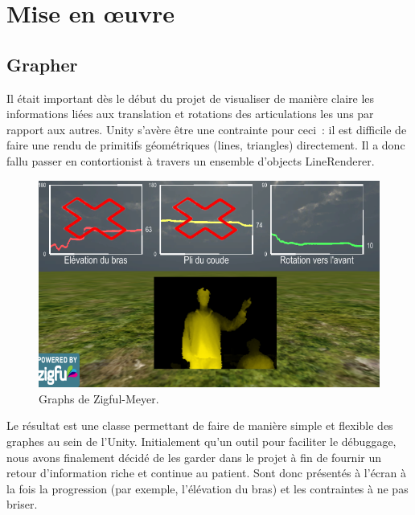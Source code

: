 \section{Mise en œuvre}

\subsection{Grapher}
Il était important dès le début du projet de visualiser de manière claire les 
informations liées aux translation et rotations des articulations les uns par 
rapport aux autres. Unity s'avère être une contrainte pour ceci~: il est difficile
de faire une rendu de primitifs géométriques (lines, triangles) directement. Il
a donc fallu passer en contortionist à travers un ensemble d'objects LineRenderer.

\begin{figure}[h!]
\centering
\includegraphics[width=\linewidth]{images/zfm_graph}
\caption{Graphs de Zigful-Meyer.}
\end{figure}

Le résultat est une classe permettant de faire de manière simple et flexible des
graphes au sein de l'Unity. Initialement qu'un outil pour faciliter le 
débuggage, nous avons finalement décidé de les garder dans le projet à fin de
fournir un retour d'information riche et continue au patient. Sont donc présentés 
à l'écran à la fois la progression (par exemple, l'élévation du bras) et les 
contraintes à ne pas briser.
    
